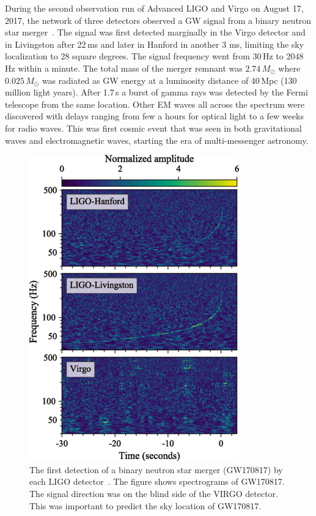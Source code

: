\documentclass{ttuthes2007}
\begin{document}
During the second observation run of Advanced LIGO and Virgo on August 17, 2017,
the network of three detectors observed a \ac{GW} signal from a binary
neutron star merger~\cite{Abbott_2017}. The signal was first detected marginally in the Virgo
detector and in Livingston after 22\,ms and later in Hanford in another 3 ms,
limiting the sky localization to 28 square degrees. The signal frequency went
from 30\,Hz to 2048\,Hz within a minute. The total mass of the merger remnant
was $2.74\,M_\odot$ where $0.025\,M_\odot$ was radiated as \ac{GW} energy at a
luminosity distance of 40\,Mpc (130 million light years). After 1.7\,s a
burst of gamma rays was detected by the Fermi telescope from the same  location.
Other \ac{EM} waves all across the spectrum were discovered with delays ranging
from few a hours for optical
light to a few weeks for radio waves. This was first cosmic event that
was seen in both gravitational waves and electromagnetic waves, starting the era
of multi-messenger astronomy. 
\begin{figure}[bhtp!] 
        \includegraphics[width=\textwidth]{figure/GW170817.png}
	\caption{The first detection of a binary neutron star merger (GW170817) by each \ac{LIGO} detector~\cite{Abbott_2017}. The figure shows spectrograms of GW170817. The signal direction was on the blind side of the VIRGO detector. This was important to predict the sky location of GW170817.}
        \label{GW170817}                                                             
\end{figure}      
\end{document}
